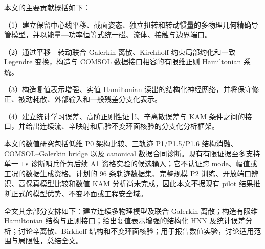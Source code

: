 本文的主要贡献概括如下：

（1）建立保留中心线平移、截面姿态、独立扭转和转动惯量的多物理几何精确导管模型，并以能量---功率恒等式统一磁、流体、接触与边界端口。

（2）通过平移---转动联合 Galerkin 离散、Kirchhoff 约束局部约化和一致 Legendre 变换，构造与 COMSOL 数据接口相容的有限维正则 Hamiltonian 系统。

（3）构造复值表示增强、实值 Hamiltonian 读出的结构化神经网络，并将保守修正、被动耗散、外部输入和一般残差分支化表示。

（4）建立统计学习误差、高阶正则性证书、辛离散误差与 KAM 条件之间的接口，并给出连续流、辛映射和后验不变环面核验的分支化分析框架。

本文的数值研究包括低维 P0 架构比较、三轨迹 P1/P1.5/P1.6 结构消融、COMSOL--Galerkin bridge 以及 canonical 数据合同诊断。现有有限证据至多支持单一 \(1\,\mathrm{s}\) 诊断哨兵作为后续 A1 资格实验的候选输入；它不认证跨 mode、幅值或工况的数据生成资格。计划的 96 条轨迹数据集、完整规模 P2 训练、开放端口辨识、高保真模型比较和数值 KAM 分析尚未完成，因此本文不据现有 pilot 结果推断正式的模型优势、不变环面或工程安全域。

全文其余部分安排如下：建立连续多物理模型及联合 Galerkin 离散；构造有限维 Hamiltonian 结构与正则接口；给出复值表示增强的结构化 HNN 及统计误差分析；讨论辛离散、Birkhoff 结构和不变环面核验；用于报告数值实验，讨论适用范围与局限性，总结全文。
